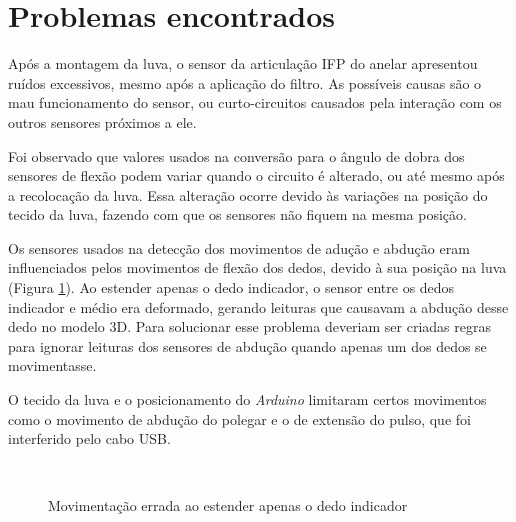 \section{Problemas encontrados}
\label{sec:prob}

Após a montagem da luva, o sensor da articulação \ac{IFP} do anelar apresentou ruídos excessivos, mesmo após a aplicação do filtro. As possíveis causas são o mau funcionamento do sensor, ou curto-circuitos causados pela interação com os outros sensores próximos a ele.

Foi observado que valores usados na conversão para o ângulo de dobra dos sensores de flexão podem variar quando o circuito é alterado, ou até mesmo após a recolocação da luva. Essa alteração ocorre devido às variações na posição do tecido da luva, fazendo com que os sensores não fiquem na mesma posição.

Os sensores usados na detecção dos movimentos de adução e abdução eram influenciados pelos movimentos de flexão dos dedos, devido à sua posição na luva (Figura \ref{fig:pos_indic}). Ao estender apenas o dedo indicador, o sensor entre os dedos indicador e médio era deformado, gerando leituras que causavam a abdução desse dedo no modelo \ac{3D}. Para solucionar esse problema deveriam ser criadas regras para ignorar leituras dos sensores de abdução quando apenas um dos dedos se movimentasse.

O tecido da luva e o posicionamento do \textit{Arduino} limitaram certos movimentos como o movimento de abdução do polegar e o de extensão do pulso, que foi interferido pelo cabo \ac{USB}.

\begin{figure}[H]
  \setlength{\abovecaptionskip}{0pt}
  \setlength{\belowcaptionskip}{0pt}
  \caption[Movimentação errada ao estender apenas o dedo indicador]{Movimentação errada ao estender apenas o dedo indicador}
  \centering
  \quad
  \\
  \captionsetup{justification=centering}
  \label{fig:pos_indic}
\end{figure}


